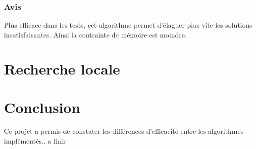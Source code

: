 \documentclass[a4paper,12pt]{report}
\begin{document}
	\subsubsection{Avis}
	Plus efficace dans les tests, cet algorithme permet d'élaguer plus vite les solutions insatisfaisantes. Ainsi la contrainte de mémoire est moindre.
	
	\section{Recherche locale}
	

	\newpage	
	\section*{Conclusion}
	Ce projet a permis de constater les différences d'efficacité entre les algorithmes implémentés.. a finir
\end{document}
